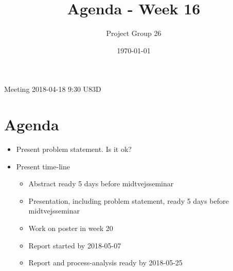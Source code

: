 \documentclass{article}
\title{Agenda - Week 16}
\author{Project Group 26}
\date{\today}
\begin{document}
\maketitle

Meeting 2018-04-18 9:30 U83D

\section{Agenda}

\begin{itemize}
    \item Present problem statement. Is it ok?
    \item Present time-line
    \begin{itemize}
        \item Abstract ready 5 days before midtvejsseminar
        \item Presentation, including problem statement, ready 5 days before                 midtvejsseminar
        \item Work on poster in week 20
        \item Report started by 2018-05-07
        \item Report and process-analysis ready by 2018-05-25
    \end{itemize}
\end{itemize}
\end{document}
